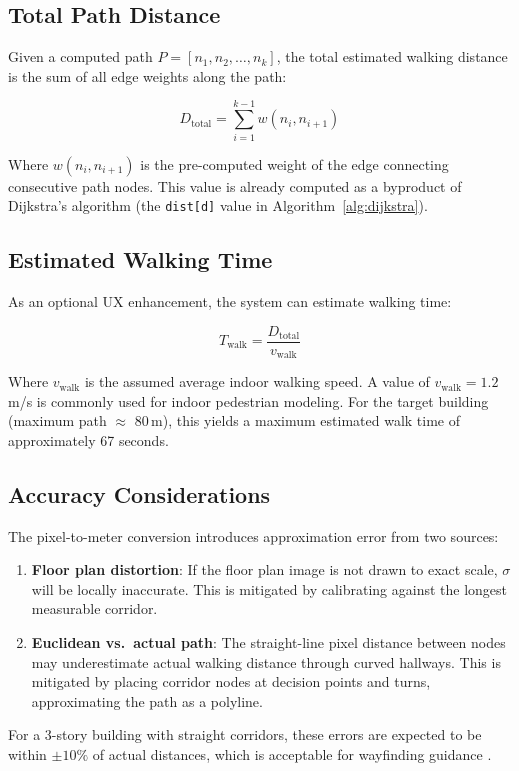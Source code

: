 \subsection{Total Path Distance}

Given a computed path $P = [n_1, n_2, \ldots, n_k]$, the total estimated walking distance is the sum of all edge weights along the path:

\begin{equation}
D_{\text{total}} = \sum_{i=1}^{k-1} w(n_i, n_{i+1})
\label{eq:total-distance}
\end{equation}

Where $w(n_i, n_{i+1})$ is the pre-computed weight of the edge connecting consecutive path nodes. This value is already computed as a byproduct of Dijkstra's algorithm (the \texttt{dist[d]} value in Algorithm~\ref{alg:dijkstra}).

\subsection{Estimated Walking Time}

As an optional UX enhancement, the system can estimate walking time:

\begin{equation}
T_{\text{walk}} = \frac{D_{\text{total}}}{v_{\text{walk}}}
\label{eq:walk-time}
\end{equation}

Where $v_{\text{walk}}$ is the assumed average indoor walking speed. A value of $v_{\text{walk}} = 1.2$ m/s is commonly used for indoor pedestrian modeling. For the target building (maximum path $\approx$ 80\,m), this yields a maximum estimated walk time of approximately 67 seconds.

\subsection{Accuracy Considerations}

The pixel-to-meter conversion introduces approximation error from two sources:

\begin{enumerate}
  \item \textbf{Floor plan distortion}: If the floor plan image is not drawn to exact scale, $\sigma$ will be locally inaccurate. This is mitigated by calibrating against the longest measurable corridor.
  \item \textbf{Euclidean vs.\ actual path}: The straight-line pixel distance between nodes may underestimate actual walking distance through curved hallways. This is mitigated by placing corridor nodes at decision points and turns, approximating the path as a polyline.
\end{enumerate}

For a 3-story building with straight corridors, these errors are expected to be within $\pm 10\%$ of actual distances, which is acceptable for wayfinding guidance \cite{Park2020}.

